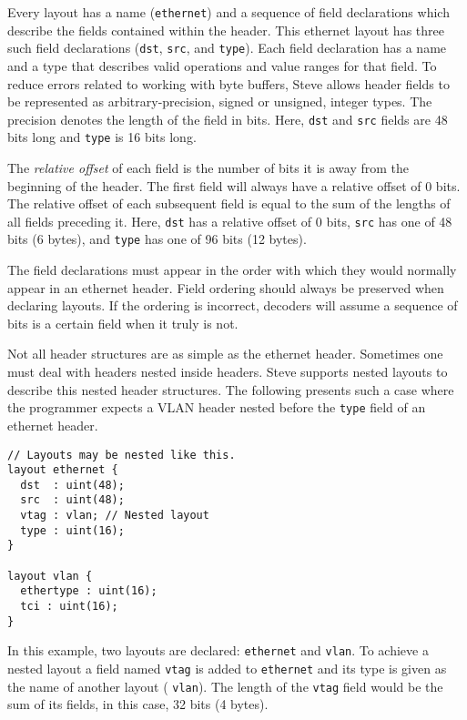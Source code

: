 Every layout has a name (\texttt{ethernet}) and a sequence of field declarations
which describe the fields contained within the header.
This ethernet layout has three such field declarations (\texttt{dst}, \texttt{src},
and \texttt{type}).
Each field declaration has a name and a type that describes valid operations and
value ranges for that field.
To reduce errors related to working with byte buffers, Steve allows header fields to
be represented as arbitrary-precision, signed or unsigned, integer types.
The precision denotes the length of the field in bits.
Here, \texttt{dst} and \texttt{src} fields are 48 bits long and \texttt{type} is
16 bits long.

The \textit{relative offset} of each field is the number of bits it is away
from the beginning of the header. The first field will always have a relative
offset of 0 bits. The relative offset of each subsequent field is equal to the
sum of the lengths of all fields preceding it. Here, \texttt{dst} has a relative
offset of 0 bits, \texttt{src} has one of 48 bits (6 bytes), and \texttt{type} has one of
96 bits (12 bytes).

The field declarations must appear in the order with which they would normally appear
in an ethernet header. Field ordering should always be
preserved when declaring layouts. If the ordering is incorrect, decoders will
assume a sequence of bits is a certain field when it truly is not. 

Not all header structures are as simple as the ethernet header. Sometimes one
must deal with headers nested inside headers. Steve supports nested layouts
to describe this nested header structures.
The following presents such a case where the programmer expects a VLAN header
\cite{vlan_std} nested before the \texttt{type} field of an ethernet
header.

\begin{codepage}
\begin{lstlisting}
// Layouts may be nested like this.
layout ethernet {
  dst  : uint(48);
  src  : uint(48);
  vtag : vlan; // Nested layout
  type : uint(16);
}

layout vlan {
  ethertype : uint(16);
  tci : uint(16);
}
\end{lstlisting}
\end{codepage}

In this example, two layouts are declared: \texttt{ethernet} and \texttt{vlan}. To
achieve a nested layout a field named \texttt{vtag} is added to
\texttt{ethernet} and its type is given as the name of another layout (
\texttt{vlan}). The length of the \texttt{vtag} field would be the sum of
its fields, in this case, 32 bits (4 bytes).

